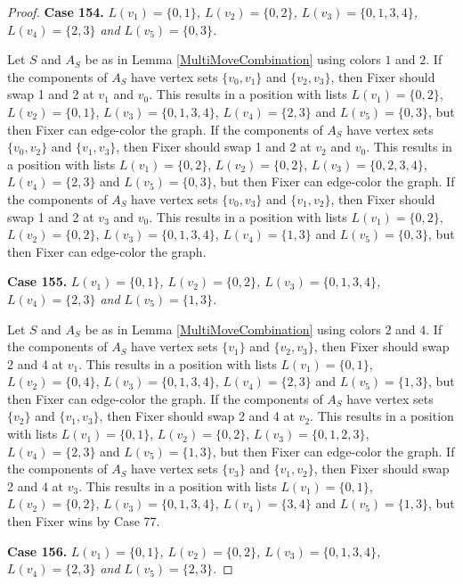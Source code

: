\documentclass[12pt]{amsart}
\theoremstyle{plain}
\theoremstyle{definition}
\theoremstyle{remark}
\begin{document}
\begin{proof}
\noindent\textbf{Case 154.  }\textit{$L(v_1) = \{0, 1\}$, $L(v_2) = \{0, 2\}$, $L(v_3) = \{0, 1, 3, 4\}$, $L(v_4) = \{2, 3\}$ and $L(v_5) = \{0, 3\}$.}

Let $S$ and $A_S$ be as in Lemma \ref{MultiMoveCombination} using colors $1$ and $2$. If the components of $A_S$ have vertex sets $\{v_0, v_1\}$ and $\{v_2, v_3\}$, then Fixer should swap 1 and 2 at $v_1$ and $v_0$. This results in a position with lists $L(v_1) = \{0, 2\}$, $L(v_2) = \{0, 1\}$, $L(v_3) = \{0, 1, 3, 4\}$, $L(v_4) = \{2, 3\}$ and $L(v_5) = \{0, 3\}$, but then Fixer can edge-color the graph. If the components of $A_S$ have vertex sets $\{v_0, v_2\}$ and $\{v_1, v_3\}$, then Fixer should swap 1 and 2 at $v_2$ and $v_0$. This results in a position with lists $L(v_1) = \{0, 2\}$, $L(v_2) = \{0, 2\}$, $L(v_3) = \{0, 2, 3, 4\}$, $L(v_4) = \{2, 3\}$ and $L(v_5) = \{0, 3\}$, but then Fixer can edge-color the graph. If the components of $A_S$ have vertex sets $\{v_0, v_3\}$ and $\{v_1, v_2\}$, then Fixer should swap 1 and 2 at $v_3$ and $v_0$. This results in a position with lists $L(v_1) = \{0, 2\}$, $L(v_2) = \{0, 2\}$, $L(v_3) = \{0, 1, 3, 4\}$, $L(v_4) = \{1, 3\}$ and $L(v_5) = \{0, 3\}$, but then Fixer can edge-color the graph. 

\noindent\textbf{Case 155.  }\textit{$L(v_1) = \{0, 1\}$, $L(v_2) = \{0, 2\}$, $L(v_3) = \{0, 1, 3, 4\}$, $L(v_4) = \{2, 3\}$ and $L(v_5) = \{1, 3\}$.}

Let $S$ and $A_S$ be as in Lemma \ref{MultiMoveCombination} using colors $2$ and $4$. If the components of $A_S$ have vertex sets $\{v_1\}$ and $\{v_2, v_3\}$, then Fixer should swap 2 and 4 at $v_1$. This results in a position with lists $L(v_1) = \{0, 1\}$, $L(v_2) = \{0, 4\}$, $L(v_3) = \{0, 1, 3, 4\}$, $L(v_4) = \{2, 3\}$ and $L(v_5) = \{1, 3\}$, but then Fixer can edge-color the graph. If the components of $A_S$ have vertex sets $\{v_2\}$ and $\{v_1, v_3\}$, then Fixer should swap 2 and 4 at $v_2$. This results in a position with lists $L(v_1) = \{0, 1\}$, $L(v_2) = \{0, 2\}$, $L(v_3) = \{0, 1, 2, 3\}$, $L(v_4) = \{2, 3\}$ and $L(v_5) = \{1, 3\}$, but then Fixer can edge-color the graph. If the components of $A_S$ have vertex sets $\{v_3\}$ and $\{v_1, v_2\}$, then Fixer should swap 2 and 4 at $v_3$. This results in a position with lists $L(v_1) = \{0, 1\}$, $L(v_2) = \{0, 2\}$, $L(v_3) = \{0, 1, 3, 4\}$, $L(v_4) = \{3, 4\}$ and $L(v_5) = \{1, 3\}$, but then Fixer wins by Case 77. 

\noindent\textbf{Case 156.  }\textit{$L(v_1) = \{0, 1\}$, $L(v_2) = \{0, 2\}$, $L(v_3) = \{0, 1, 3, 4\}$, $L(v_4) = \{2, 3\}$ and $L(v_5) = \{2, 3\}$.}


\end{proof}
\end{document}
